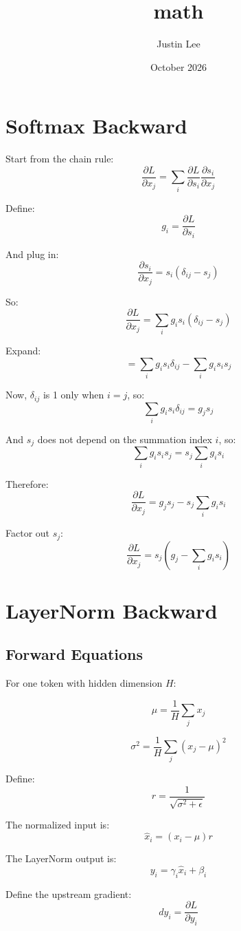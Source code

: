 \documentclass{article}
\title{math}
\author{Justin Lee}
\date{October 2026}
\begin{document}
\maketitle

\section{Softmax Backward}

Start from the chain rule:
\[
\frac{\partial L}{\partial x_j}
=\sum_i\frac{\partial L}{\partial s_i}
\frac{\partial s_i}{\partial x_j}
\]

Define:
\[
g_i=\frac{\partial L}{\partial s_i}
\]

And plug in:
\[
\frac{\partial s_i}{\partial x_j}
=s_i(\delta_{ij}-s_j)
\]

So:
\[
\frac{\partial L}{\partial x_j}
=\sum_i g_i s_i(\delta_{ij}-s_j)
\]

Expand:
\[
=\sum_i g_i s_i\delta_{ij}
-\sum_i g_i s_i s_j
\]

Now, $\delta_{ij}$ is 1 only when $i=j$, so:
\[
\sum_i g_i s_i\delta_{ij}=g_j s_j
\]

And $s_j$ does not depend on the summation index $i$, so:
\[
\sum_i g_i s_i s_j=s_j\sum_i g_i s_i
\]

Therefore:
\[
\frac{\partial L}{\partial x_j}
=g_j s_j-s_j\sum_i g_i s_i
\]

Factor out $s_j$:
\[
\boxed{
\frac{\partial L}{\partial x_j}
=s_j\left(g_j-\sum_i g_i s_i\right)
}
\]

\section{LayerNorm Backward}

\subsection{Forward Equations}

For one token with hidden dimension $H$:

\[
\mu=\frac{1}{H}\sum_j x_j
\]

\[
\sigma^2=\frac{1}{H}\sum_j(x_j-\mu)^2
\]

Define:
\[
r=\frac{1}{\sqrt{\sigma^2+\epsilon}}
\]

The normalized input is:
\[
\hat{x}_i=(x_i-\mu)r
\]

The LayerNorm output is:
\[
y_i=\gamma_i\hat{x}_i+\beta_i
\]

Define the upstream gradient:
\[
dy_i=\frac{\partial L}{\partial y_i}
\]
\end{document}
